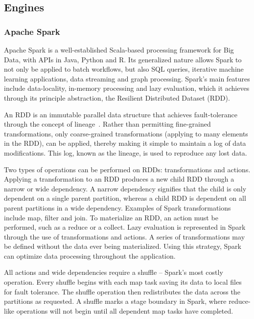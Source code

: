 \documentclass{IEEEtran}
\begin{document}
\subsection{Engines} %

\subsubsection{Apache Spark}

Apache Spark is a well-established Scala-based processing framework for Big Data, with
APIs in Java, Python and R. Its 
generalized nature allows Spark to not only be applied to batch workflows,
but also SQL queries, iterative machine learning applications, 
data streaming and graph processing. Spark's
main features include data-locality, in-memory processing and lazy evaluation,
which it achieves through its principle abstraction, the Resilient Distributed 
Dataset (RDD). 

An RDD is an immutable parallel data structure that achieves fault-tolerance 
through the concept of lineage~\cite{zaharia2010spark}. Rather than permitting
fine-grained transformations, only coarse-grained transformations (applying to
many elements in the RDD), can be applied, thereby making it simple to maintain a 
log of data modifications. This log, known as the lineage, is used
to reproduce any lost data.

Two types of operations can be performed on RDDs:
transformations and actions. Applying a transformation to an RDD produces a new
child RDD through a narrow or wide dependency. A narrow dependency signifies 
that the child is only dependent on a single parent partition, whereas a child 
RDD is dependent on all parent partitions in a wide dependency. Examples of 
Spark transformations include map, filter and join. To materialize an RDD, an
action must be performed, such as a reduce or a collect. Lazy evaluation is 
represented in Spark through the use of transformations and actions. A series of
transformations may be defined without the data ever being materialized. Using 
this strategy, Spark can optimize data processing
throughout the application.

All actions and wide dependencies require a shuffle -- Spark's most costly
operation. Every shuffle begins with each map task saving its data to local
files for fault tolerance. The shuffle operation then 
redistributes the data across the partitions as requested. A shuffle marks a 
stage boundary in Spark, where reduce-like operations will not begin 
until all dependent map tasks have completed.
\end{document}
